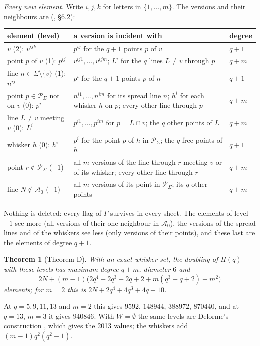 \documentclass[11pt]{amsart}
\newtheorem{theorem}{Theorem}[section]
\theoremstyle{definition}
\theoremstyle{remark}
\newcommand{\cA}{\mathcal{A}}
\newcommand{\PS}{\mathcal{P}_{\Sigma}}
\begin{document}
\emph{Every new element.} Write $i,j,k$ for letters in $\{1,\dots,m\}$. The versions and their neighbours are (, \S6.2):
\begin{center}\small
\renewcommand{\arraystretch}{1.15}
\begin{tabular}{@{}>{\raggedright}p{}>{\raggedright}p{}>{\raggedright\arraybackslash}p{}@{}}
\toprule
element (level) & a version is incident with & degree\\
\midrule
$v$ (2): $v^{ijk}$ & $p^{ij}$ for the $q+1$ points $p$ of $v$ & $q+1$\\
point $p$ of $v$ (1): $p^{ij}$ & $v^{ij1},\dots,v^{ijm}$; $L^i$ for the $q$ lines $L\ne v$ through $p$ & $q+m$\\
line $n\in \Sigma\setminus\{v\}$ (1): $n^{ij}$ & $p^i$ for the $q+1$ points $p$ of $n$ & $q+1$\\
point $p\in\PS$ not on $v$ (0): $p^i$ & $n^{i1},\dots,n^{im}$ for its spread line $n$; $h^i$ for each whisker $h$ on $p$; every other line through $p$ & $q+m$\\
line $L\ne v$ meeting $v$ (0): $L^i$ & $p^{i1},\dots,p^{im}$ for $p=L\cap v$; the $q$ other points of $L$ & $q+m$\\
whisker $h$ (0): $h^i$ & $p^i$ for the point $p$ of $h$ in $\PS$; the $q$ free points of $h$ & $q+1$\\
point $r\notin\PS$ ($-1$) & all $m$ versions of the line through $r$ meeting $v$ or of its whisker; every other line through $r$ & $q+m$\\
line $N\notin\cA_0$ ($-1$) & all $m$ versions of its point in $\PS$; its $q$ other points & $q+m$\\
\bottomrule
\end{tabular}
\end{center}
Nothing is deleted: every flag of $\Gamma$ survives in every sheet. The elements of level $-1$ see more (all versions of their one neighbour in $\cA_0$), the versions of the spread lines and of the whiskers see less (only versions of their points), and these last are the elements of degree $q+1$.

\begin{theorem}[Theorem D]\label{thm:D}
With an exact whisker set, the doubling of $H(q)$ with these levels has maximum degree $q+m$, diameter $6$ and
\[
2N+(m-1)\bigl(2q^4+2q^3+2q+2+m(q^3+q+2)+m^2\bigr)
\]
elements; for $m=2$ this is $2N+2q^4+4q^3+4q+10$. 
\end{theorem}

At $q=5,9,11,13$ and $m=2$ this gives $9592$, $148944$, $388972$, $870440$, and at $q=13$, $m=3$ it gives $940846$. With $W=\emptyset$ the same levels are Delorme's construction \cite[\S8(b)]{D85a}, which gives the 2013 values; the whiskers add $(m-1)q^2(q^2-1)$.
\end{document}
